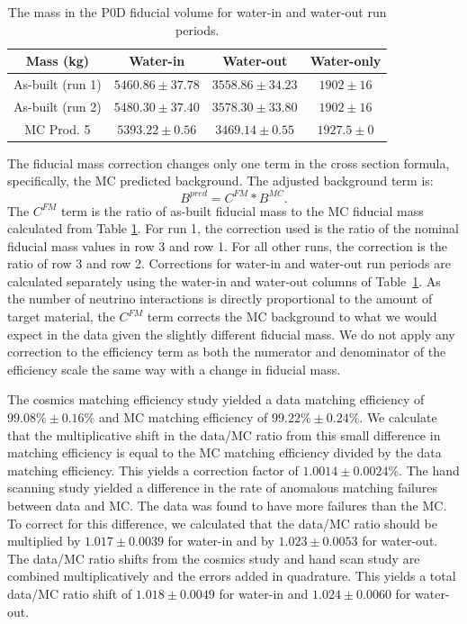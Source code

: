 \begin{table}[h]
\caption{The mass in the P0D fiducial volume for water-in and water-out run periods.}
\label{tab:fidmass}
\centering
\begin{tabular}{cccc}\toprule
Mass (kg) & Water-in & Water-out & Water-only \\\midrule
As-built (run 1) & $5460.86 \pm 37.78$ & $3558.86 \pm 34.23$ & $1902 \pm 16$\\
As-built (run 2)& $5480.30 \pm 37.40$ & $3578.30 \pm 33.80$ & $1902 \pm 16$\\
MC Prod. 5 & $5393.22\pm 0.56$ & $3469.14 \pm 0.55$ & $1927.5 \pm 0$ \\
\bottomrule
\end{tabular}
\end{table}

The fiducial mass correction changes only one term in the cross section formula, specifically, the MC predicted background. The adjusted background term is:
\begin{equation}
B^{pred} = C^{FM} * B^{MC}.
\end{equation}
The $C^{FM}$ term is the ratio of as-built fiducial mass to the MC fiducial mass calculated from Table \ref{tab:fidmass}. For run 1, the correction used is the ratio of the nominal fiducial mass values in row 3 and row 1. For all other runs, the correction is the ratio of row 3 and row 2. Corrections for water-in and water-out run periods are calculated separately using the water-in and water-out columns of Table~\ref{tab:fidmass}. As the number of neutrino interactions is directly proportional to the amount of target material, the $C^{FM}$ term corrects the MC background to what we would expect in the data given the slightly different fiducial mass. We do not apply any correction to the efficiency term as both the numerator and denominator of the efficiency scale the same way with a change in fiducial mass. 

The cosmics matching efficiency study yielded a data matching efficiency of $99.08\% \pm 0.16\%$ and MC matching efficiency of $99.22\% \pm 0.24\%$. We calculate that the multiplicative shift in the data/MC ratio from this small difference in matching efficiency is equal to the MC matching efficiency divided by the data matching efficiency. This yields a correction factor of $1.0014 \pm 0.0024\%$. The hand scanning study yielded a difference in the rate of anomalous matching failures between data and MC. The data was found to have more failures than the MC. To correct for this difference, we calculated that the data/MC ratio should be multiplied by $1.017 \pm 0.0039$ for water-in and by $1.023 \pm 0.0053$ for water-out. The data/MC ratio shifts from the cosmics study and hand scan study are combined multiplicatively and the errors added in quadrature. This yields a total data/MC ratio shift of $1.018 \pm 0.0049$ for water-in and $1.024 \pm 0.0060$ for water-out.

